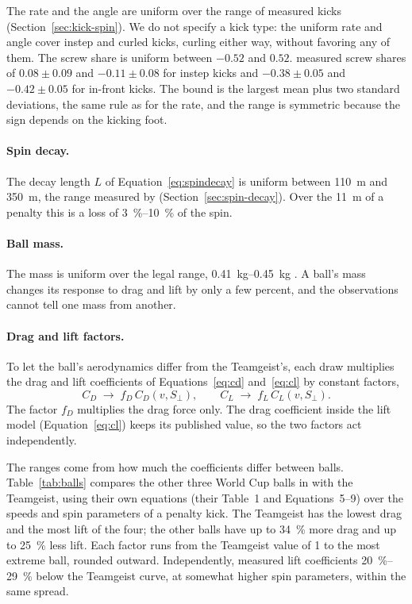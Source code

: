 \documentclass[10pt,a4paper]{article}
\begin{document}
The rate and the angle are uniform over the range of measured kicks
(Section~\ref{sec:kick-spin}). We do not specify a kick type: the uniform rate
and angle cover instep and curled kicks, curling either way, without favoring
any of them. The screw share is uniform between $-0.52$ and $0.52$.
\citet{tsukada2011} measured screw shares of $0.08 \pm 0.09$ and
$-0.11 \pm 0.08$ for instep kicks and $-0.38 \pm 0.05$ and $-0.42 \pm 0.05$
for in-front kicks. The bound is the largest mean plus two standard
deviations, the same rule as for the rate, and the range is symmetric
because the sign depends on the kicking foot.

\paragraph{Spin decay.} The decay length $L$ of Equation~\eqref{eq:spindecay}
is uniform between \SI{110}{\metre} and \SI{350}{\metre}, the range measured by
\citet{tsukada2008} (Section~\ref{sec:spin-decay}). Over the \SI{11}{\metre}
of a penalty this is a loss of \SIrange{3}{10}{\percent} of the spin.

\paragraph{Ball mass.} The mass is uniform over the legal range,
\SIrange{0.41}{0.45}{\kilo\gram} \citep{ifab2025}. A ball's mass changes its
response to drag and lift by only a few percent, and the observations cannot
tell one mass from another.

\paragraph{Drag and lift factors.} To let the ball's aerodynamics differ from
the Teamgeist's, each draw multiplies the drag and lift coefficients of
Equations~\eqref{eq:cd} and~\eqref{eq:cl} by constant factors,
\begin{equation}
  C_D \;\to\; f_D\, C_D(v, S_\perp), \qquad
  C_L \;\to\; f_L\, C_L(v, S_\perp).
  \label{eq:factors}
\end{equation}
The factor $f_D$ multiplies the drag force only. The drag coefficient inside
the lift model (Equation~\eqref{eq:cl}) keeps its published value, so the two
factors act independently.

The ranges come from how much the coefficients differ between balls.
Table~\ref{tab:balls} compares the other
three World Cup balls in \citet{kiratidis2018} with the Teamgeist, using their
own equations (their Table~1 and Equations~5--9) over the speeds and spin
parameters of a penalty kick. The Teamgeist has the lowest drag and the most
lift of the four; the other balls have up to \SI{34}{\percent} more drag and up
to \SI{25}{\percent} less lift. Each factor runs from the Teamgeist value of 1
to the most extreme ball, rounded outward. Independently, \citet{carre2002}
measured lift coefficients \SIrange{20}{29}{\percent} below the Teamgeist
curve, at somewhat higher spin parameters, within the same spread.
\end{document}
